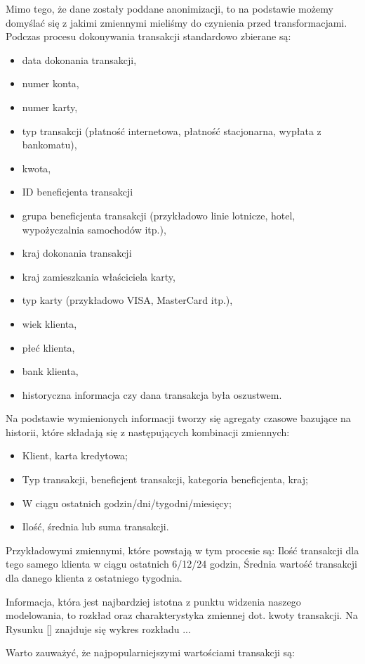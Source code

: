 \documentclass[inzynierska]{pwr_wmat_praca_dyplomowa}
\theoremstyle{plain}
\numberwithin{theorem}{chapter}
\theoremstyle{definition}
\numberwithin{theorem}{chapter}
\begin{document}
Mimo tego, że dane zostały poddane anonimizacji, to na podstawie \cite{CSCCFD} możemy domyślać się z jakimi zmiennymi mieliśmy do czynienia przed transformacjami. Podczas procesu dokonywania transakcji standardowo zbierane są: 
\begin{itemize}
	\item data dokonania transakcji, 
	\item numer konta,
	\item numer karty,
	\item typ transakcji (płatność internetowa, płatność stacjonarna, wypłata z bankomatu),
	\item kwota, 
	\item ID beneficjenta transakcji
	\item grupa beneficjenta transakcji (przykładowo linie lotnicze, hotel, wypożyczalnia samochodów itp.), 
	\item kraj dokonania transakcji
	\item kraj zamieszkania właściciela karty,
	\item typ karty (przykładowo VISA, MasterCard itp.),
	\item wiek klienta, 
 	\item płeć klienta,
	\item bank klienta,
	\item historyczna informacja czy dana transakcja była oszustwem.
\end{itemize}
Na podstawie wymienionych informacji tworzy się agregaty czasowe bazujące na historii, które składają się z następujących kombinacji zmiennych:
\begin{itemize}
	\item Klient, karta kredytowa;
	\item Typ transakcji, beneficjent transakcji, kategoria beneficjenta, kraj;
	\item W ciągu ostatnich godzin/dni/tygodni/miesięcy;
	\item Ilość, średnia lub suma transakcji.
\end{itemize}
Przykładowymi zmiennymi, które powstają w tym procesie są: Ilość transakcji dla tego samego klienta w ciągu ostatnich 6/12/24 godzin, Średnia wartość transakcji dla danego klienta z ostatniego tygodnia. 

Informacja, która jest najbardziej istotna z punktu widzenia naszego modelowania, to rozkład oraz charakterystyka zmiennej dot. kwoty transakcji. Na Rysunku \ref{} znajduje się wykres rozkładu ... 

Warto zauważyć, że najpopularniejszymi wartościami transakcji są: 
\end{document}
